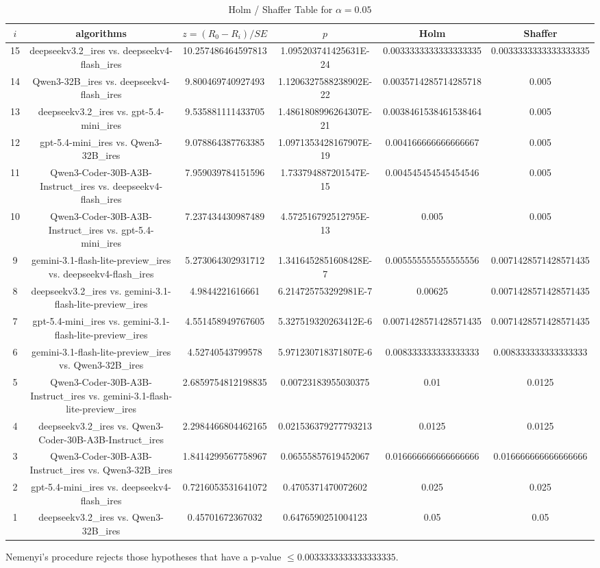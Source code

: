 \documentclass[a4paper,10pt]{article}
\begin{document}
\begin{landscape}
\begin{table}[!htp]
\centering\tiny
\caption{Holm / Shaffer Table for $\alpha=0.05$}
\begin{tabular}{cccccc}
$i$&algorithms&$z=(R_0 - R_i)/SE$&$p$&Holm&Shaffer\\
\hline
15&deepseekv3.2_ires vs. deepseekv4-flash_ires&10.257486464597813&1.095203741425631E-24&0.0033333333333333335&0.0033333333333333335\\14&Qwen3-32B_ires vs. deepseekv4-flash_ires&9.800469740927493&1.1206327588238902E-22&0.0035714285714285718&0.005\\13&deepseekv3.2_ires vs. gpt-5.4-mini_ires&9.535881111433705&1.4861808996264307E-21&0.0038461538461538464&0.005\\12&gpt-5.4-mini_ires vs. Qwen3-32B_ires&9.078864387763385&1.0971353428167907E-19&0.004166666666666667&0.005\\11&Qwen3-Coder-30B-A3B-Instruct_ires vs. deepseekv4-flash_ires&7.959039784151596&1.733794887201547E-15&0.004545454545454546&0.005\\10&Qwen3-Coder-30B-A3B-Instruct_ires vs. gpt-5.4-mini_ires&7.237434430987489&4.572516792512795E-13&0.005&0.005\\9&gemini-3.1-flash-lite-preview_ires vs. deepseekv4-flash_ires&5.273064302931712&1.3416452851608428E-7&0.005555555555555556&0.0071428571428571435\\8&deepseekv3.2_ires vs. gemini-3.1-flash-lite-preview_ires&4.9844221616661&6.214725753292981E-7&0.00625&0.0071428571428571435\\7&gpt-5.4-mini_ires vs. gemini-3.1-flash-lite-preview_ires&4.551458949767605&5.327519320263412E-6&0.0071428571428571435&0.0071428571428571435\\6&gemini-3.1-flash-lite-preview_ires vs. Qwen3-32B_ires&4.52740543799578&5.971230718371807E-6&0.008333333333333333&0.008333333333333333\\5&Qwen3-Coder-30B-A3B-Instruct_ires vs. gemini-3.1-flash-lite-preview_ires&2.6859754812198835&0.00723183955030375&0.01&0.0125\\4&deepseekv3.2_ires vs. Qwen3-Coder-30B-A3B-Instruct_ires&2.2984466804462165&0.021536379277793213&0.0125&0.0125\\3&Qwen3-Coder-30B-A3B-Instruct_ires vs. Qwen3-32B_ires&1.8414299567758967&0.06555857619452067&0.016666666666666666&0.016666666666666666\\2&gpt-5.4-mini_ires vs. deepseekv4-flash_ires&0.7216053531641072&0.4705371470072602&0.025&0.025\\1&deepseekv3.2_ires vs. Qwen3-32B_ires&0.45701672367032&0.6476590251004123&0.05&0.05\\\hline
\end{tabular}
\end{table}
Nemenyi's procedure rejects those hypotheses that have a p-value $\le0.0033333333333333335$.



\end{landscape}
\end{document}
